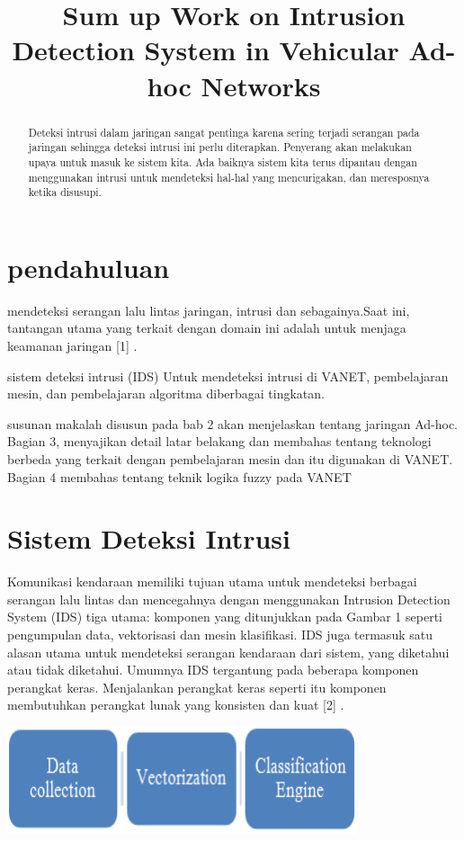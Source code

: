 \documentclass[conference]{IEEEtran}
\title{Sum up Work on Intrusion Detection System in Vehicular Ad-hoc Networks}
\author{\IEEEauthorblockN{Johanes Wilian Ang}
\IEEEauthorblockA{\textit{Fakultas Teknologi Informasi} \\
\textit{Institut Teknologi Batam}\\
Batam, Indonesia \\
email: johanwilian455@gmail.com,}
}
\begin{document}
\maketitle
\begin{abstract}
    Deteksi intrusi dalam jaringan sangat pentinga karena sering terjadi serangan pada jaringan sehingga deteksi intrusi ini perlu diterapkan. Penyerang akan melakukan upaya untuk masuk ke sistem kita. Ada baiknya sistem kita terus dipantau dengan menggunakan intrusi untuk mendeteksi hal-hal yang mencurigakan, dan meresposnya ketika disusupi.
\end{abstract}

\section{pendahuluan}
    mendeteksi serangan lalu lintas jaringan, intrusi dan sebagainya.Saat ini, tantangan utama yang terkait dengan domain ini adalah untuk menjaga keamanan jaringan [1] \cite {aydin2009hybrid}.
    
    sistem deteksi intrusi (IDS) Untuk mendeteksi intrusi di VANET, pembelajaran mesin, dan pembelajaran algoritma diberbagai tingkatan.
    
    susunan makalah disusun pada bab 2 akan menjelaskan tentang jaringan Ad-hoc. Bagian 3, menyajikan detail latar belakang dan membahas tentang teknologi berbeda yang terkait dengan pembelajaran mesin dan itu digunakan di VANET. Bagian 4 membahas tentang teknik logika fuzzy pada VANET

\section{Sistem Deteksi Intrusi}
    Komunikasi kendaraan memiliki tujuan utama untuk mendeteksi berbagai serangan lalu lintas dan mencegahnya dengan menggunakan Intrusion Detection System (IDS) tiga utama: komponen yang ditunjukkan pada Gambar 1 seperti pengumpulan data, vektorisasi dan mesin klasifikasi. IDS juga termasuk satu alasan utama untuk mendeteksi serangan kendaraan dari sistem, yang diketahui atau tidak diketahui. Umumnya IDS tergantung pada beberapa komponen perangkat keras. Menjalankan perangkat keras seperti itu komponen membutuhkan perangkat lunak yang konsisten dan kuat [2] \cite {zhang2010research}.

\begin{center}
\includegraphics[width=.4\textwidth]{gambar/tugas7-1.PNG}

\end{center}
\end{document}
